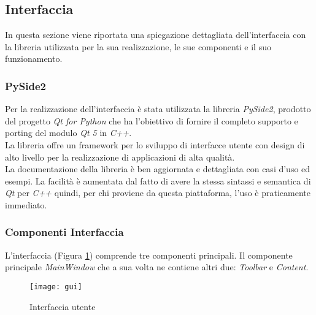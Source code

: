 \subsection{Interfaccia}\label{interfaccia}
In questa sezione viene riportata una spiegazione dettagliata dell'interfaccia con la libreria utilizzata per la sua realizzazione, le sue componenti e il suo funzionamento.
\subsubsection{PySide2}\label{pyside2}
Per la realizzazione dell'interfaccia è stata utilizzata la libreria \emph{PySide2}, prodotto del progetto \emph{Qt for Python} che ha l'obiettivo di fornire il completo supporto e porting del modulo \emph{Qt 5} in \emph{C++}.\\
La libreria offre un framework per lo sviluppo di interfacce utente con design di alto livello per la realizzazione di applicazioni di alta qualità.\\
La documentazione della libreria è ben aggiornata e dettagliata con casi d'uso ed esempi. La facilità è aumentata dal fatto di avere la stessa sintassi e semantica di \emph{Qt} per \emph{C++} quindi, per chi proviene da questa piattaforma, l'uso è praticamente immediato.

\subsubsection{Componenti Interfaccia} \label{compInterfaccia}
L'interfaccia (Figura \ref{fig:interfaccia}) comprende tre componenti principali. Il componente principale \emph{MainWindow} che a sua volta ne contiene altri due: \emph{Toolbar} e \emph{Content}.

\begin{figure}[H]
    \texttt{[image: gui]}\centering
    \caption{Interfaccia utente}\label{fig:interfaccia}
\end{figure}


